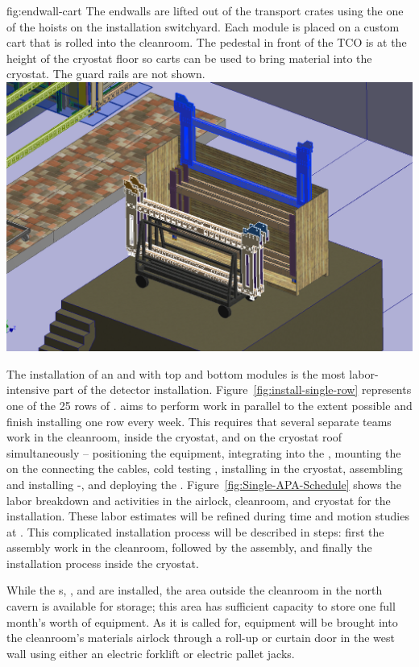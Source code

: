 \begin{dunefigure}{fig:endwall-cart}
  {The endwalls are lifted out of the transport crates using the one of the hoists on the installation switchyard. Each module is  placed on a custom cart that is rolled into the cleanroom. The pedestal in front of the TCO is at the height of the cryostat floor so carts can be used to bring material into the cryostat. The guard rails are not shown.}
\includegraphics[width=.5\textwidth]{graphics/endwall-cart.png}
\end{dunefigure}




The installation of an  and   with top and bottom  modules is the most labor-intensive part of the detector installation. Figure~\ref{fig:install-single-row} represents one of the 25 rows of .   aims to perform work in parallel to the extent possible and finish installing one row every week. 
This requires that several separate teams work in the cleanroom, inside the cryostat, and on the cryostat roof simultaneously --  positioning the equipment, integrating  into the , mounting the   on the  connecting the cables, cold testing , installing  in the cryostat, assembling and installing -, and deploying the .
Figure~\ref{fig:Single-APA-Schedule} shows the labor breakdown and activities in the airlock,  cleanroom, and cryostat for the  installation. These labor estimates will be refined during time and motion studies at . 
This complicated installation process will be described in steps: first the  assembly work in the cleanroom, followed by the  assembly, and finally the installation process inside the cryostat.

While the s, , and  are installed, the area outside the cleanroom in the north cavern is available for storage; this area has sufficient capacity to store one full month's worth of equipment. As it is called for, equipment will be brought into the cleanroom's materials airlock through a roll-up or curtain door in the west wall using either an electric forklift or electric pallet jacks.

